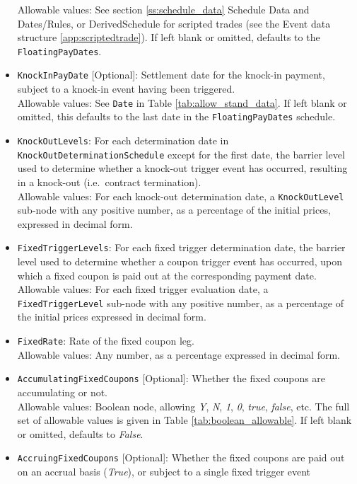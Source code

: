\begin{itemize}
    Allowable values: See section \ref{ss:schedule_data} Schedule Data and Dates/Rules, or
    DerivedSchedule for scripted trades (see the Event data structure \ref{app:scriptedtrade}).
    If left blank or omitted, defaults to the \lstinline!FloatingPayDates!.
  \item \lstinline!KnockInPayDate! [Optional]: Settlement date for the knock-in
  payment, subject to a knock-in event having been triggered. \\
    Allowable values: See \lstinline!Date! in Table \ref{tab:allow_stand_data}. If left blank
    or omitted, this defaults to the last date in the \lstinline!FloatingPayDates! schedule.
  \item \lstinline!KnockOutLevels!: For each determination date in
  \lstinline!KnockOutDeterminationSchedule! except for the first date, the barrier level used
  to determine whether a knock-out trigger event has occurred, resulting in a knock-out (i.e.\
  contract termination). \\
    Allowable values: For each knock-out determination date, a \lstinline!KnockOutLevel!
    sub-node with any positive number, as a percentage of the initial prices, expressed in
    decimal form.
  \item \lstinline!FixedTriggerLevels!: For each fixed trigger determination date, the
  barrier level used to determine whether a coupon trigger event has occurred, upon which a
  fixed coupon is paid out at the corresponding payment date. \\
    Allowable values: For each fixed trigger evaluation date, a \lstinline!FixedTriggerLevel!
    sub-node with any positive number, as a percentage of the initial prices expressed in
    decimal form.
  \item \lstinline!FixedRate!: Rate of the fixed coupon leg. \\
    Allowable values: Any number, as a percentage expressed in decimal form.
  \item \lstinline!AccumulatingFixedCoupons! [Optional]: Whether the fixed coupons are accumulating or not. \\
    Allowable values: Boolean node, allowing \emph{Y}, \emph{N}, \emph{1}, \emph{0},
    \emph{true}, \emph{false}, etc. The full set of allowable values is given in Table
    \ref{tab:boolean_allowable}. If left blank or omitted, defaults to \emph{False}.
  \item \lstinline!AccruingFixedCoupons! [Optional]: Whether the fixed coupons are paid
  out on an accrual basis (\emph{True}), or subject to a single fixed trigger event

\end{itemize}
